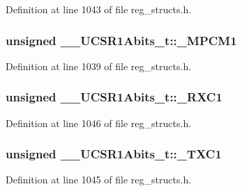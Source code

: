 Definition at line 1043 of file reg\+\_\+structs.\+h.

\hypertarget{union_____u_c_s_r1_abits__t_ab7f184689175f44151a369c8e44ae3b1}{
\subsubsection[{\+\_\+\+M\+P\+C\+M1}]{\setlength{\rightskip}{0pt plus 5cm}unsigned \+\_\+\+\_\+\+U\+C\+S\+R1\+Abits\+\_\+t\+::\+\_\+\+M\+P\+C\+M1}}\label{union_____u_c_s_r1_abits__t_ab7f184689175f44151a369c8e44ae3b1}


Definition at line 1039 of file reg\+\_\+structs.\+h.

\hypertarget{union_____u_c_s_r1_abits__t_a730365a58a3ec5054ab414a485b0d2f1}{
\subsubsection[{\+\_\+\+R\+X\+C1}]{\setlength{\rightskip}{0pt plus 5cm}unsigned \+\_\+\+\_\+\+U\+C\+S\+R1\+Abits\+\_\+t\+::\+\_\+\+R\+X\+C1}}\label{union_____u_c_s_r1_abits__t_a730365a58a3ec5054ab414a485b0d2f1}


Definition at line 1046 of file reg\+\_\+structs.\+h.

\hypertarget{union_____u_c_s_r1_abits__t_a9c421bf237d3202f597c6c9c5792d78b}{
\subsubsection[{\+\_\+\+T\+X\+C1}]{\setlength{\rightskip}{0pt plus 5cm}unsigned \+\_\+\+\_\+\+U\+C\+S\+R1\+Abits\+\_\+t\+::\+\_\+\+T\+X\+C1}}\label{union_____u_c_s_r1_abits__t_a9c421bf237d3202f597c6c9c5792d78b}


Definition at line 1045 of file reg\+\_\+structs.\+h.

